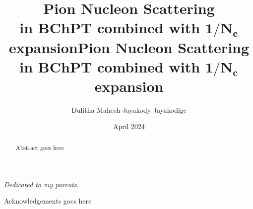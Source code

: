 \documentclass[12pt]{hamptondissertation-s}
\author{Dulitha Mahesh Jayakody Jayakodige}
\date{April 2024}
\title{Pion Nucleon Scattering \\ in BChPT combined with $\mathbf{1/N_c}$ expansion}
\begin{document}



\frontmatter

\maketitle

\cleardoublepage

\makesignature

\copyrightpage[2023]
\title{Pion Nucleon Scattering in BChPT combined with $\mathbf{1/N_c}$ expansion}

\begin{abstract}
Abstract goes here 


\end{abstract}


\begin{dedication}
\centerline{\emph{Dedicated to my parents.}}
\end{dedication}

\begin{Acknowledgements}
Acknowledgements goes here
\end{Acknowledgements}

\tableofcontents

\listoftables

\listoffigures



\mainmatter

    
   








%
%

\appendix



%
\end{document}
